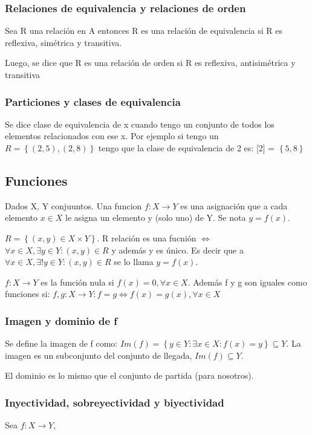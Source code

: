 \documentclass{article}
\begin{document}
\subsubsection{Relaciones de equivalencia y relaciones de orden}
Sea R una relación en A entonces R es una relación de equivalencia si R es reflexiva, simétrica y transitiva.

Luego, se dice que R es una relación de orden si R es reflexiva, antisimétrica y transitiva

\subsubsection{Particiones y clases de equivalencia}
Se dice clase de equivalencia de x cuando tengo un conjunto de todos los elementos relacionados con ese x. Por ejemplo si tengo un $R=\left\{(2,5),(2,8)\right\}$ tengo que la clase de equivalencia de 2 es: [2] = $\left\{5,8\right\}$

\subsection{Funciones}
Dados X, Y conjuuntos. Una funcion $f:X \rightarrow Y$ es una asignación que a cada elemento $x \in X$ le asigna un elemento y (solo uno) de Y. Se nota $y=f(x)$.

$R = \left\{(x,y) \in X \times Y\right\}$. R relación es una fucnión $\iff$ $\forall x \in X, \exists y \in Y: (x,y)\in R$ y además y es único. Es decir que a $\forall x \in X, \exists! y \in Y: (x,y) \in R$ se lo llama $y=f(x)$.

$f:X \rightarrow Y$ es la función nula si $f(x)=0, \forall x \in X$. Además f y g son iguales como funciones si: $f,g:X \rightarrow Y: f=g \iff f(x) = g(x), \forall x\in X$

\subsubsection{Imagen y dominio de f}
Se define la imagen de f como: $Im(f) = \left\{y\in Y: \exists x \in X: f(x) = y\right\} \subseteq Y$. La imagen es un subconjunto del conjunto de llegada, $Im(f) \subseteq Y$.

El dominio es lo mismo que el conjunto de partida (para nosotros).

\subsubsection{Inyectividad, sobreyectividad y biyectividad}
Sea $f:X \rightarrow Y$,
\end{document}
